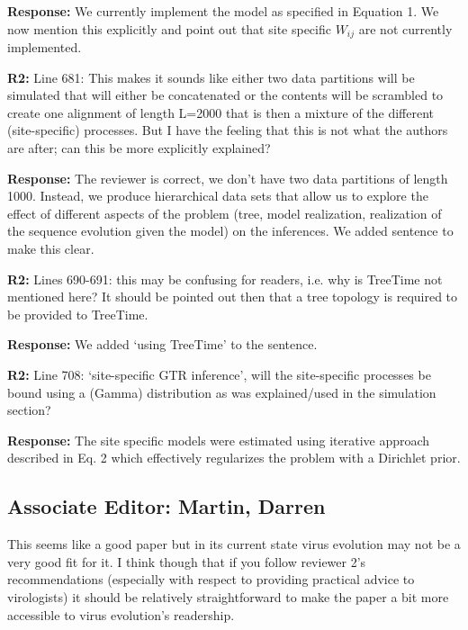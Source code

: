 \documentclass[aps,rmp,onecolumn]{revtex4-1}
\newcommand{\refb}[1]{\textbf{R2:} #1}
\newcommand{\response}[1]{{\color{black}\textbf{Response:} #1}}
\begin{document}
\response{We currently implement the model as specified in Equation 1. We now mention this explicitly and point out that site specific $W_{ij}$ are not currently implemented.}


\refb{Line 681: This makes it sounds like either two data partitions will be simulated that will either be concatenated or the contents will be scrambled to create one alignment of length L=2000 that is then a mixture of the different (site-specific) processes. But I have the feeling that this is not what the authors are after; can this be more explicitly explained?}

\response{The reviewer is correct, we don't have two data partitions of length 1000.
Instead, we produce hierarchical data sets that allow us to explore the effect of different aspects of the problem (tree, model realization, realization of the sequence evolution given the model) on the inferences.
We added sentence to make this clear. }


\refb{Lines 690-691: this may be confusing for readers, i.e. why is TreeTime not mentioned here? It should be pointed out then that a tree topology is required to be provided to TreeTime.}

\response{We added `using TreeTime' to the sentence.}

\refb{Line 708: ‘site-specific GTR inference’, will the site-specific processes be bound using a (Gamma) distribution as was explained/used in the simulation section?}

\response{The site specific models were estimated using iterative approach described in Eq. 2 which effectively regularizes the problem with a Dirichlet prior. }

\subsection*{Associate Editor: Martin, Darren}

This seems like a good paper but in its current state virus evolution may not be a very good fit for it.  I think though that if you follow reviewer 2's recommendations (especially with respect to providing practical advice to virologists) it should be relatively straightforward to make the paper a bit more accessible to virus evolution's readership.
\end{document}
